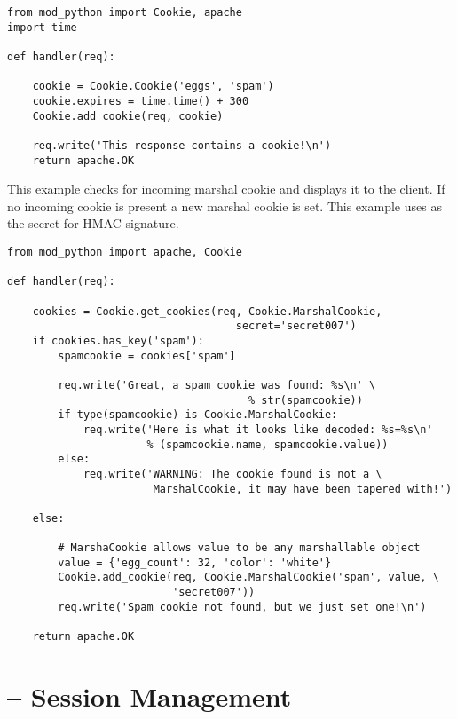 \begin{verbatim}
from mod_python import Cookie, apache
import time

def handler(req):

    cookie = Cookie.Cookie('eggs', 'spam')
    cookie.expires = time.time() + 300
    Cookie.add_cookie(req, cookie)

    req.write('This response contains a cookie!\n')
    return apache.OK

\end{verbatim}

This example checks for incoming marshal cookie and displays it to the
client. If no incoming cookie is present a new marshal cookie is set.
This example uses  as the secret for HMAC signature.

\begin{verbatim}
from mod_python import apache, Cookie

def handler(req):
    
    cookies = Cookie.get_cookies(req, Cookie.MarshalCookie,
                                    secret='secret007')
    if cookies.has_key('spam'):
        spamcookie = cookies['spam']

        req.write('Great, a spam cookie was found: %s\n' \
                                      % str(spamcookie))
        if type(spamcookie) is Cookie.MarshalCookie:
            req.write('Here is what it looks like decoded: %s=%s\n'
                      % (spamcookie.name, spamcookie.value))
        else:
            req.write('WARNING: The cookie found is not a \
                       MarshalCookie, it may have been tapered with!')

    else:

        # MarshaCookie allows value to be any marshallable object
        value = {'egg_count': 32, 'color': 'white'}
        Cookie.add_cookie(req, Cookie.MarshalCookie('spam', value, \
                          'secret007'))
        req.write('Spam cookie not found, but we just set one!\n')

    return apache.OK
\end{verbatim}

\section{ -- Session Management\label{pyapi-sess}}
\modulesynopsis{Session Management}

